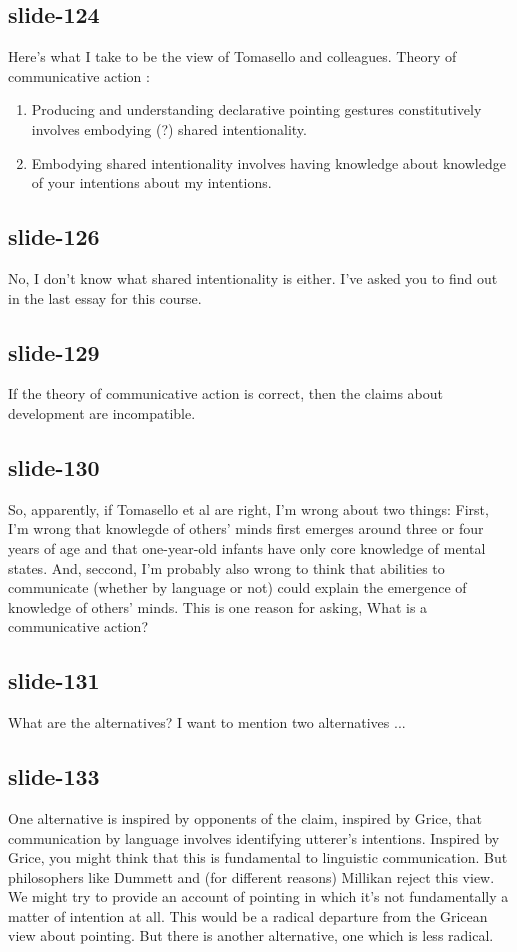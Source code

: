 \documentclass[12pt,\papersize]{extarticle}
\begin{document}
 
\subsection{slide-124}
Here's what I take to be the view of Tomasello and colleagues.
Theory of communicative action \citep[compare][]{Tomasello:2007fi}:
\begin{enumerate}
\item
Producing and understanding declarative pointing gestures constitutively involves embodying (?) shared intentionality.
\item
Embodying shared intentionality involves having knowledge about knowledge of your intentions about my intentions.
\end{enumerate}
 
 
\subsection{slide-126}
No, I don't know what shared intentionality is either. I've asked you to find out in the last essay for this course.
 
 
\subsection{slide-129}
If the theory of communicative action is correct, then the claims about development are incompatible.
 
 
\subsection{slide-130}
So, apparently, if Tomasello et al are right, I'm wrong about two things:
First, I'm wrong that knowlegde of others' minds first emerges around three or four years of age and that one-year-old infants have only core knowledge of mental states.
And, seccond, I'm probably also wrong to think that abilities to communicate (whether by language or not) could explain the emergence of knowledge of others' minds.
This is one reason for asking, What is a communicative action?
 
 
\subsection{slide-131}
What are the alternatives?
I want to mention two alternatives ...
 
 
\subsection{slide-133}
One alternative is inspired by opponents of the claim, inspired by Grice, that communication by language involves identifying utterer's intentions.
Inspired by Grice, you might think that this is fundamental to linguistic communication.
But philosophers like Dummett and (for different reasons) Millikan reject this view.
We might try to provide an account of pointing in which it's not fundamentally a matter of intention at all.
This would be a radical departure from the Gricean view about pointing. But there is another alternative, one which is less radical.
 
\end{document}
